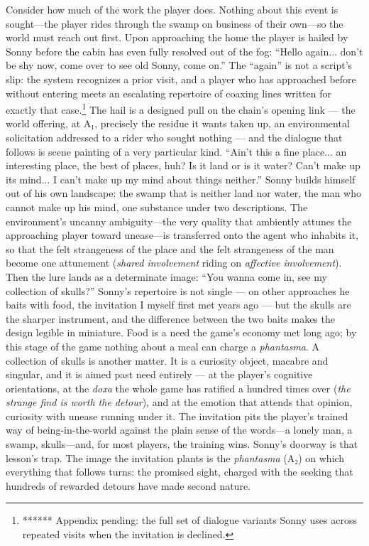\documentclass{article}
\begin{document}
Consider how much of the work the player does. Nothing about this event is sought---the player rides through the swamp on business of their own---so the world must reach out first. Upon approaching the home the player is hailed by Sonny before the cabin has even fully resolved out of the fog: ``Hello again... don't be shy now, come over to see old Sonny, come on.'' The ``again'' is not a script's slip: the system recognizes a prior visit, and a player who has approached before without entering meets an escalating repertoire of coaxing lines written for exactly that case.\footnote{****** Appendix pending: the full set of dialogue variants Sonny uses across repeated visits when the invitation is declined.} The hail is a designed pull on the chain's opening link --- the world offering, at A₁, precisely the residue it wants taken up, an environmental solicitation addressed to a rider who sought nothing --- and the dialogue that follows is scene painting of a very particular kind. ``Ain't this a fine place... an interesting place, the best of places, huh? Is it land or is it water? Can't make up its mind... I can't make up my mind about things neither.''
Sonny builds himself out of his own landscape: the swamp that is neither land nor water, the man who cannot make up his mind, one substance under two descriptions. The environment's uncanny ambiguity---the very quality that ambiently attunes the approaching player toward unease---is transferred onto the agent who inhabits it, so that the felt strangeness of the place and the felt strangeness of the man become one attunement (\textit{shared involvement} riding on \textit{affective involvement}). Then the lure lands as a determinate image: ``You wanna come in, see my collection of skulls?'' Sonny's repertoire is not single --- on other approaches he baits with food, the invitation I myself first met years ago --- but the skulls are the sharper instrument, and the difference between the two baits makes the design legible in miniature. Food is a need the game's economy met long ago; by this stage of the game nothing about a meal can charge a \textit{phantasma}. A collection of skulls is another matter. It is a curiosity object, macabre and singular, and it is aimed past need entirely --- at the player's cognitive orientations, at the \textit{doxa} the whole game has ratified a hundred times over (\textit{the strange find is worth the detour}), and at the emotion that attends that opinion, curiosity with unease running under it. The invitation pits the player's trained way of being-in-the-world against the plain sense of the words---a lonely man, a swamp, skulls---and, for most players, the training wins. Sonny's doorway is that lesson's trap. The image the invitation plants is the \textit{phantasma} (A₂) on which everything that follows turns: the promised sight, charged with the seeking that hundreds of rewarded detours have made second nature.
\end{document}
